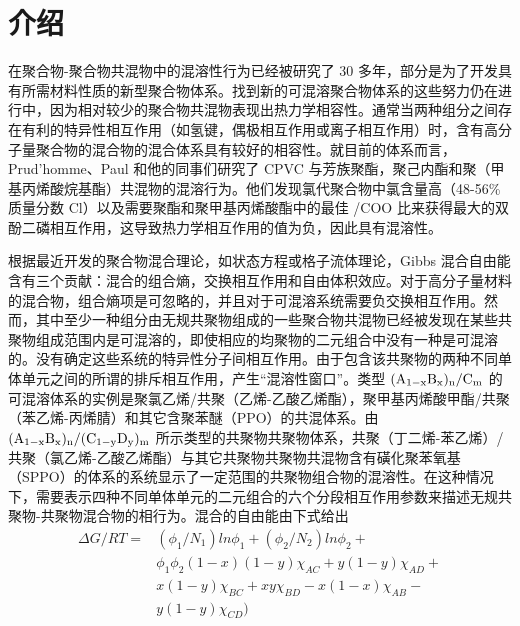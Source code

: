 \documentclass[a4paper,transmag,12pt]{IEEEtran}    %
\begin{document}
\section{介绍}
在聚合物-聚合物共混物中的混溶性行为已经被研究了 30 多年，部分是为了开发具有所需材料性质的新型聚合物体系。找到新的可混溶聚合物体系的这些努力仍在进行中，因为相对较少的聚合物共混物表现出热力学相容性。通常当两种组分之间存在有利的特异性相互作用（如氢键，偶极相互作用或离子相互作用）时，含有高分子量聚合物的混合物的混合体系具有较好的相容性。就目前的体系而言，Prud'homme、Paul 和他的同事们研究了 CPVC 与芳族聚酯，聚己内酯和聚（甲基丙烯酸烷基酯）共混物的混溶行为。他们发现氯代聚合物中氯含量高（48-56\% 质量分数 Cl）以及需要聚酯和聚甲基丙烯酸酯中的最佳 /COO 比来获得最大的双酚二磷相互作用，这导致热力学相互作用的值为负，因此具有混溶性。\par{}
根据最近开发的聚合物混合理论，如状态方程或格子流体理论，Gibbs 混合自由能含有三个贡献：混合的组合熵，交换相互作用和自由体积效应。对于高分子量材料的混合物，组合熵项是可忽略的，并且对于可混溶系统需要负交换相互作用。然而，其中至少一种组分由无规共聚物组成的一些聚合物共混物已经被发现在某些共聚物组成范围内是可混溶的，即使相应的均聚物的二元组合中没有一种是可混溶的。没有确定这些系统的特异性分子间相互作用。由于包含该共聚物的两种不同单体单元之间的所谓的排斥相互作用，产生“混溶性窗口”。类型 $\rm{(A_{1-x}B_x)_n/C_m}$ 的可混溶体系的实例是聚氯乙烯/共聚（乙烯-乙酸乙烯酯），聚甲基丙烯酸甲酯/共聚（苯乙烯-丙烯腈）和其它含聚苯醚（PPO）的共混体系。由 $\rm{(A_{1-x}B_x)_n/(C_{1-y}D_y)_m}$ 所示类型的共聚物共聚物体系，共聚（丁二烯-苯乙烯）/共聚（氯乙烯-乙酸乙烯酯）与其它共聚物共聚物共混物含有磺化聚苯氧基（SPPO）的体系的系统显示了一定范围的共聚物组合物的混溶性。在这种情况下，需要表示四种不同单体单元的二元组合的六个分段相互作用参数来描述无规共聚物-共聚物混合物的相行为。混合的自由能由下式给出
\begin{equation}
    \begin{aligned}
        \varDelta G/RT = &(\phi_1/N_1)ln\phi_1 + (\phi_2/N_2)ln\phi_2 + \\
                          &\phi_1\phi_2(1-x)(1-y)\chi_{AC} + y(1-y)\chi_{AD} + \\
                          &x(1-y)\chi_{BC} + xy\chi_{BD} - x(1-x)\chi_{AB} - \\
                          &y(1-y)\chi_{CD})
    \end{aligned}
\end{equation}
\end{document}
